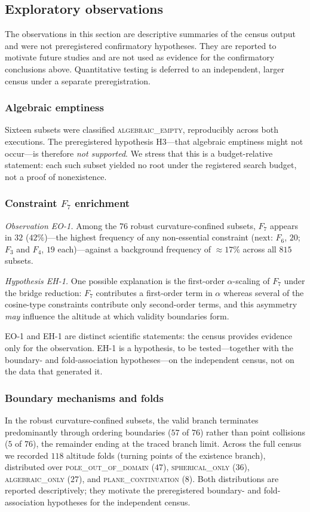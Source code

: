 \documentclass[pdflatex,sn-mathphys-num]{sn-jnl}
\theoremstyle{thmstyleone}%
\theoremstyle{thmstyletwo}%
\theoremstyle{thmstylethree}%
\begin{document}
\subsection{Exploratory observations}
\label{sec:exploratory}

The observations in this section are descriptive summaries of the census output and were not preregistered confirmatory hypotheses. They are reported to motivate future studies and are not used as evidence for the confirmatory conclusions above. Quantitative testing is deferred to an independent, larger census under a separate preregistration.

\subsubsection{Algebraic emptiness}
Sixteen subsets were classified \textsc{algebraic\_empty}, reproducibly across both executions. The preregistered hypothesis H3---that algebraic emptiness might not occur---is therefore \emph{not supported}. We stress that this is a budget-relative statement: each such subset yielded no root under the registered search budget, not a proof of nonexistence.

\subsubsection{\texorpdfstring{Constraint $F_7$ enrichment}{Constraint F7 enrichment}}
\emph{Observation EO-1.} Among the $76$ robust curvature-confined subsets, $F_7$ appears in $32$ ($42\%$)---the highest frequency of any non-essential constraint (next: $F_6$, $20$; $F_3$ and $F_4$, $19$ each)---against a background frequency of $\approx 17\%$ across all $815$ subsets.

\emph{Hypothesis EH-1.} One possible explanation is the first-order $\alpha$-scaling of $F_7$ under the bridge reduction: $F_7$ contributes a
first-order term in $\alpha$ whereas several of the cosine-type constraints
contribute only second-order terms, and this asymmetry \emph{may} influence the altitude at which validity boundaries form.

EO-1 and EH-1 are distinct scientific statements: the census provides evidence only for the observation. EH-1 is a hypothesis, to be tested---together with the boundary- and fold-association hypotheses---on the independent census, not on the data that generated it.

\subsubsection{Boundary mechanisms and folds}
In the robust curvature-confined subsets, the valid branch terminates predominantly through ordering boundaries ($57$ of $76$) rather than point collisions ($5$ of $76$), the remainder ending at the traced branch limit. Across the full census we recorded $118$ altitude folds (turning points of the existence branch), distributed over \textsc{pole\_out\_of\_domain} ($47$), \textsc{spherical\_only} ($36$), \textsc{algebraic\_only} ($27$), and \textsc{plane\_continuation} ($8$). Both distributions are reported descriptively; they motivate the preregistered boundary- and fold-association hypotheses for the independent census.
\end{document}
